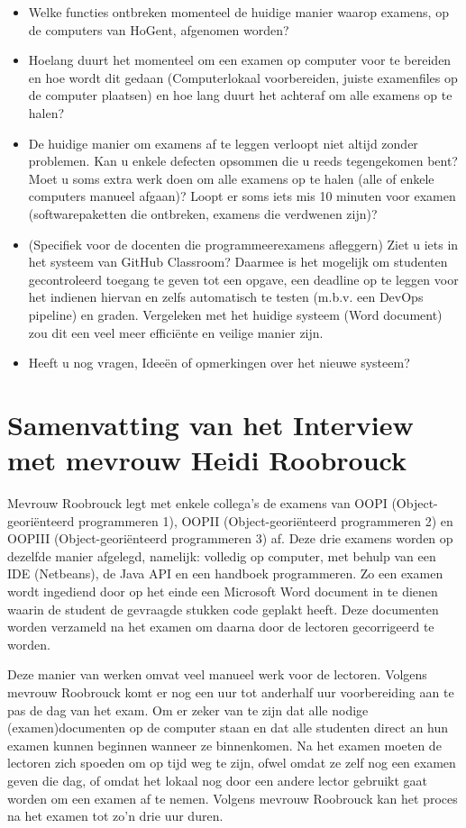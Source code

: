\begin{itemize}
\begin{itemize}
\end{itemize}	
	\bigskip 
	\item Welke functies ontbreken momenteel de huidige manier waarop examens, op de computers van HoGent, afgenomen worden?
	\bigskip 
	\item Hoelang duurt het momenteel om een examen op computer voor te bereiden en hoe wordt dit gedaan (Computerlokaal voorbereiden, juiste examenfiles op de computer plaatsen) en hoe lang duurt het achteraf om alle examens op te halen?
	\bigskip 
	\item De huidige manier om examens af te leggen verloopt niet altijd zonder problemen. Kan u enkele defecten opsommen die u reeds tegengekomen bent? Moet u soms extra werk doen om alle examens op te halen (alle of enkele computers manueel afgaan)? Loopt er soms iets mis 10 minuten voor examen (softwarepaketten die ontbreken, examens die verdwenen zijn)? 
	\bigskip
	\item (Specifiek voor de docenten die programmeerexamens afleggern) Ziet u iets in het systeem van GitHub Classroom? Daarmee is het mogelijk om studenten gecontroleerd toegang te geven tot een opgave, een deadline op te leggen voor het indienen hiervan en zelfs automatisch te testen (m.b.v. een DevOps pipeline) en graden. Vergeleken met het huidige systeem (Word document) zou dit een veel meer efficiënte en veilige manier zijn.
	\bigskip 
	\item Heeft u nog vragen, Ideeën of opmerkingen over het nieuwe systeem?
	
\end{itemize}

\section{Samenvatting van het Interview met mevrouw Heidi Roobrouck}

Mevrouw Roobrouck legt met enkele collega's de examens van OOPI (Object-georiënteerd programmeren 1), OOPII (Object-georiënteerd programmeren 2) en OOPIII (Object-georiënteerd programmeren 3) af. Deze drie examens worden op dezelfde manier afgelegd, namelijk: volledig op computer, met behulp van een IDE (Netbeans), de Java API en een handboek programmeren. Zo een examen wordt ingediend door op het einde een Microsoft Word document in te dienen waarin de student de gevraagde stukken code geplakt heeft. Deze documenten worden verzameld na het examen om daarna door de lectoren gecorrigeerd te worden. 
\medskip 

Deze manier van werken omvat veel manueel werk voor de lectoren. Volgens mevrouw Roobrouck komt er nog een uur tot anderhalf uur voorbereiding aan te pas de dag van het exam. Om er zeker van te zijn dat alle nodige (examen)documenten op de computer staan en dat alle studenten direct an hun examen kunnen beginnen wanneer ze binnenkomen. Na het examen moeten de lectoren zich spoeden om op tijd weg te zijn, ofwel omdat ze zelf nog een examen geven die dag, of omdat het lokaal nog door een andere lector gebruikt gaat worden om een examen af te nemen. Volgens mevrouw Roobrouck kan het proces na het examen tot zo'n drie uur duren.  